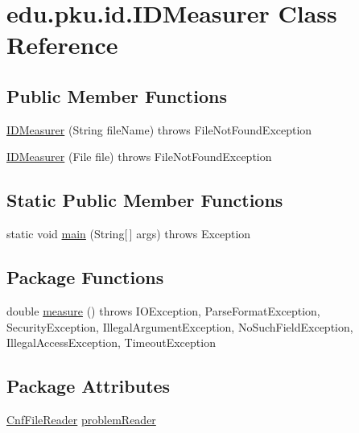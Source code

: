 \hypertarget{classedu_1_1pku_1_1id_1_1_i_d_measurer}{
\section{edu.pku.id.IDMeasurer Class Reference}
\label{classedu_1_1pku_1_1id_1_1_i_d_measurer}
}
\subsection*{Public Member Functions}
\begin{DoxyCompactItemize}
\item 
\hyperlink{classedu_1_1pku_1_1id_1_1_i_d_measurer_a65d2af55e75374876207d60a7bd9de9c}{IDMeasurer} (String fileName)  throws FileNotFoundException 
\item 
\hyperlink{classedu_1_1pku_1_1id_1_1_i_d_measurer_a74c84279b179c7eeebfa8f5924e958ce}{IDMeasurer} (File file)  throws FileNotFoundException 
\end{DoxyCompactItemize}
\subsection*{Static Public Member Functions}
\begin{DoxyCompactItemize}
\item 
static void \hyperlink{classedu_1_1pku_1_1id_1_1_i_d_measurer_acdadb95e18e539d7e54d9334f65b6cc3}{main} (String\mbox{[}$\,$\mbox{]} args)  throws Exception 
\end{DoxyCompactItemize}
\subsection*{Package Functions}
\begin{DoxyCompactItemize}
\item 
double \hyperlink{classedu_1_1pku_1_1id_1_1_i_d_measurer_aec462913189fa5fa4dc6dcee6f4a8583}{measure} ()  throws IOException, ParseFormatException, SecurityException, IllegalArgumentException, NoSuchFieldException, IllegalAccessException, 			TimeoutException 
\end{DoxyCompactItemize}
\subsection*{Package Attributes}
\begin{DoxyCompactItemize}
\item 
\hyperlink{classedu_1_1pku_1_1id_1_1_cnf_file_reader}{CnfFileReader} \hyperlink{classedu_1_1pku_1_1id_1_1_i_d_measurer_a1d0c7809f92ca53c0c7c1eeafde84275}{problemReader}
\end{DoxyCompactItemize}
